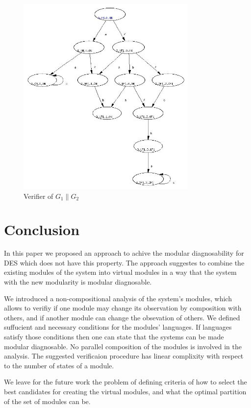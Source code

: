 \documentclass[a4paper, 10pt, conference]{ieeeconf}
\begin{document}
\begin{figure}[t]
\centering
\includegraphics[height=100mm]{verifier_G1G2.jpg}
\caption{Verifier of $G_1 \parallel G_2$}
\label{fig:verifier_G1G2}
\end{figure}


\section{Conclusion}
\label{sec:Conclusion}

In this paper we proposed an approach to achive the modular diagnosability
for DES which does not have this property. The approach suggestes to combine
the existing modules of the system into virtual modules in a way that the
system with the new modularity is modular diagnosable.

We introduced a non-compositional analysis of the system's modules, which
allows to verifiy if one module may change its observation by composition with
others, and if another module can change the obsevation of others. We defined
suffucient and necessary conditions for the modules' languages. If languages
satisfy those conditions then one can state that the systems can be made modular
diagnosable. No parallel composition of the modules is involved in the analysis.
The suggested verificaion procedure has linear complixity with respect to
the number of states of a module.

We leave for the future work the problem of defining criteria of how to select
the best candidates for creating the virtual modules, and what the optimal
partition of the set of modules can be.
\end{document}
